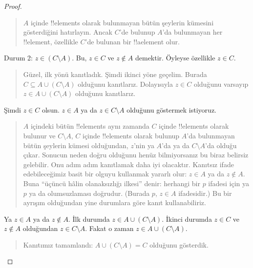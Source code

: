 \documentclass[../../../include/open-logic-section]{subfiles}
\begin{document}
\begin{proof}
\begin{quote}
    $A$ içinde !!{element}s olarak bulunmayan bütün şeylerin kümesini
    gösterdiğini hatırlayın. Ancak $C$'de bulunup $A$'da bulunmayan her
    !!{element}, özellikle $C$'de bulunan bir !!a{element} olur.
  \end{quote}
  Durum 2: $z \in (C \setminus A)$. Bu, $z \in C$ ve $z \notin A$
  demektir. Öyleyse özellikle $z \in C$.
  \begin{quote}
    Güzel, ilk yönü kanıtladık. Şimdi ikinci yöne geçelim. Burada $C
    \subseteq A \cup (C \setminus A)$ olduğunu kanıtlarız. Dolayısıyla
    $z \in C$ olduğunu varsayıp $z \in A \cup (C \setminus A)$ olduğunu
    kanıtlarız.
  \end{quote}
  Şimdi $z \in C$ olsun. $z \in A$ ya da $z \in C \setminus A$
  olduğunu göstermek istiyoruz.
  \begin{quote}
    $A$ içindeki bütün !!{element}s aynı zamanda $C$ içinde !!{element}s
    olarak bulunur ve $C \setminus A$, $C$ içinde !!{element}s olarak bulunup $A$'da bulunmayan
    bütün şeylerin kümesi olduğundan, $z$'nin ya $A$'da ya da $C
    \setminus A$'da olduğu çıkar. Sonucun neden doğru olduğunu henüz
    bilmiyorsanız bu biraz belirsiz gelebilir. Onu adım adım kanıtlamak
    daha iyi olacaktır. Kanıtsız ifade edebileceğimiz basit bir olguyu
    kullanmak yararlı olur: $z \in A$ ya da $z \notin A$. Buna
    ``üçüncü hâlin olanaksızlığı ilkesi'' denir: herhangi bir $p$
    ifadesi için ya $p$ ya da olumsuzlaması doğrudur. (Burada $p$, $z
    \in A$ ifadesidir.) Bu bir ayrışım olduğundan yine durumlara göre
    kanıt kullanabiliriz.
  \end{quote}
  Ya $z \in A$ ya da $z \notin A$. İlk durumda $z \in A \cup (C
  \setminus A)$. İkinci durumda $z \in C$ ve $z \notin A$ olduğundan
  $z \in C \setminus A$. Fakat o zaman $z \in A \cup (C \setminus A)$.
  \begin{quote}
    Kanıtımız tamamlandı: $A \cup (C \setminus A) = C$ olduğunu gösterdik.
  \end{quote}
\end{proof}
\end{document}

